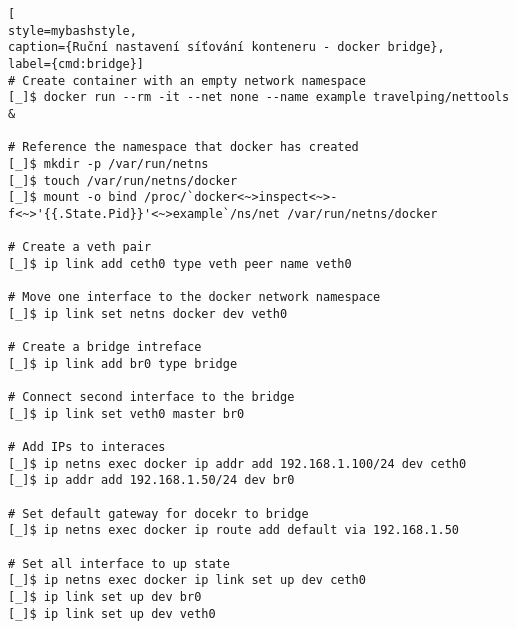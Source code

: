 \begin{lstfloat}
\begin{lstlisting}[
style=mybashstyle,
caption={Ruční nastavení síťování konteneru - docker bridge},
label={cmd:bridge}]
# Create container with an empty network namespace
[_]$ docker run --rm -it --net none --name example travelping/nettools &

# Reference the namespace that docker has created
[_]$ mkdir -p /var/run/netns
[_]$ touch /var/run/netns/docker
[_]$ mount -o bind /proc/`docker<~>inspect<~>-f<~>'{{.State.Pid}}'<~>example`/ns/net /var/run/netns/docker

# Create a veth pair
[_]$ ip link add ceth0 type veth peer name veth0

# Move one interface to the docker network namespace 
[_]$ ip link set netns docker dev veth0

# Create a bridge intreface
[_]$ ip link add br0 type bridge

# Connect second interface to the bridge
[_]$ ip link set veth0 master br0

# Add IPs to interaces
[_]$ ip netns exec docker ip addr add 192.168.1.100/24 dev ceth0
[_]$ ip addr add 192.168.1.50/24 dev br0

# Set default gateway for docekr to bridge
[_]$ ip netns exec docker ip route add default via 192.168.1.50

# Set all interface to up state
[_]$ ip netns exec docker ip link set up dev ceth0
[_]$ ip link set up dev br0
[_]$ ip link set up dev veth0
\end{lstlisting}
\end{lstfloat}